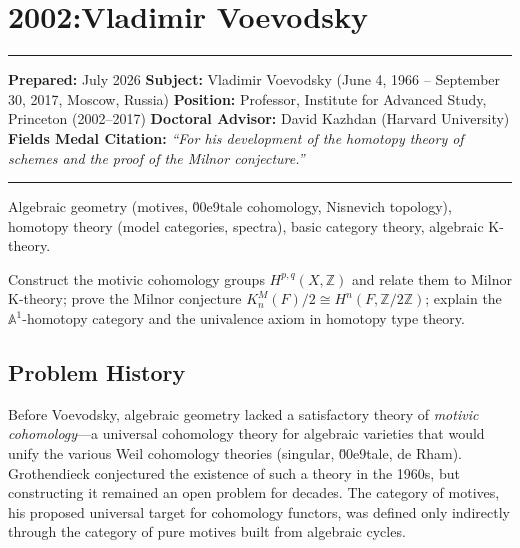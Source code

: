 \chapter{2002:Vladimir Voevodsky}\label{ch2002vladimirvoevodsky:vladimir-voevodsky-fields-medal-2002-a-comprehensive-report-on-his-work-and-impact}

\begin{center}\rule{0.5\linewidth}{0.5pt}\end{center}

\textbf{Prepared:} July 2026 \textbf{Subject:} Vladimir Voevodsky (June 4, 1966 -- September 30, 2017, Moscow, Russia) \textbf{Position:} Professor, Institute for Advanced Study, Princeton (2002--2017) \textbf{Doctoral Advisor:} David Kazhdan (Harvard University) \textbf{Fields Medal Citation:} \emph{``For his development of the homotopy theory of schemes and the proof of the Milnor conjecture.''}

\begin{center}\rule{0.5\linewidth}{0.5pt}\end{center}

\begin{prereqs} Algebraic geometry (motives, \u00e9tale cohomology, Nisnevich topology), homotopy theory (model categories, spectra), basic category theory, algebraic K-theory. \end{prereqs}

\begin{objectives} Construct the motivic cohomology groups $H^{p,q}(X, \mathbb{Z})$ and relate them to Milnor K-theory; prove the Milnor conjecture $K^M_n(F)/2 \cong H^n(F, \mathbb{Z}/2\mathbb{Z})$; explain the $\mathbb{A}^1$-homotopy category and the univalence axiom in homotopy type theory. \end{objectives}

\section{Problem History}

Before Voevodsky, algebraic geometry lacked a satisfactory theory of \emph{motivic cohomology}---a universal cohomology theory for algebraic varieties that would unify the various Weil cohomology theories (singular, \u00e9tale, de Rham). Grothendieck conjectured the existence of such a theory in the 1960s, but constructing it remained an open problem for decades. The category of motives, his proposed universal target for cohomology functors, was defined only indirectly through the category of pure motives built from algebraic cycles.

